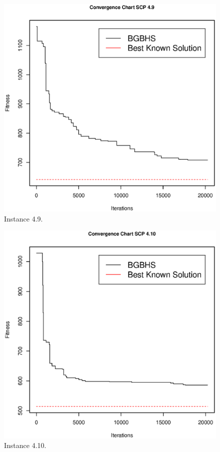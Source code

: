 \begin{figure}[]
\centering
\includegraphics[scale=.45]{Resultados/scp49.eps}
\caption{Instance 4.9.}
\label{fig:Instance.4.9}
\end{figure}

\begin{figure}[]
\centering
\includegraphics[scale=.45]{Resultados/scp410.eps}
\caption{Instance 4.10.}
\label{fig:Instance.4.10}
\end{figure}

